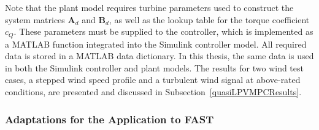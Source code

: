 %
Note that the plant model requires turbine parameters used to construct the system matrices \(\bm{A}_d\) and \(\bm{B}_d\), as well as the lookup table for the torque coefficient \(c_Q\). These parameters must be supplied to the controller, which is implemented as a MATLAB function integrated into the Simulink controller model. All required data is stored in a MATLAB data dictionary. In this thesis, the same data is used in both the Simulink controller and plant models. The results for two wind test cases, a stepped wind speed profile and a turbulent wind signal at above-rated conditions, are presented and discussed in Subsection~\ref{quasiLPVMPCResults}.

\subsubsection{Adaptations for the Application to FAST}\label{sec:qLMPCFAST}

